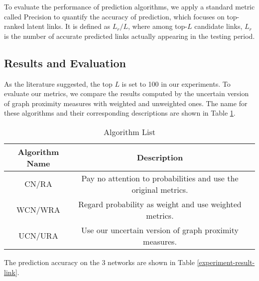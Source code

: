 \documentclass[\main/thesis.tex]{subfiles}
\begin{document}
To evaluate the performance of prediction algorithms, we apply a standard metric called Precision to quantify the accuracy of prediction, which focuses on top-ranked latent links. It is defined as $L_r/L$, where among top-$L$ candidate links, $L_r$ is the number of accurate predicted links actually appearing in the testing period.


\subsection{Results and Evaluation}
As the literature  \cite{lu2010link,lu2011link,liu2011link,tan2014link,zhu2016link} suggested, the top $L$ is set to 100 in our experiments. To evaluate our metrics, we compare the results computed by the uncertain version of graph proximity measures with weighted and unweighted ones. The name for these algorithms and their corresponding descriptions are shown in Table \ref{algorithm-list-link}.%

\begin{table}[]
\centering
\caption{Algorithm List}
\label{algorithm-list-link}
\begin{tabular}{ccc}
\hline
Algorithm Name & Description                     \\ \hline
CN/RA      & Pay no attention to probabilities and use the original metrics.  \\
WCN/WRA       & Regard probability as weight and use weighted metrics.  \\
UCN/URA    & Use our uncertain version of graph proximity measures. \\ \hline
\end{tabular}
\end{table}

The prediction accuracy on the 3 networks are shown in Table \ref{experiment-result-link}.
\end{document}
